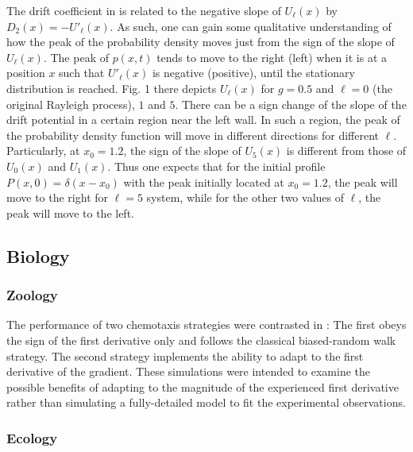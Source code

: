 \documentclass[11pt]{book}
\begin{document}
The drift coefficient in \cite{ho2020fractional} is related to the
negative slope of $U_{\ell}\left(x\right)$ by $D_{2}\left(x\right)=-U'_{\ell}\left(x\right)$.
As such, one can gain some qualitative understanding of how the peak of
the probability density moves just from the sign of the slope of $U_{\ell}\left(x\right)$.
The peak of $p\left(x,t\right)$ tends to move to the right (left)
when it is at a position $x$ such that $U'_{\ell}\left(x\right)$
is negative (positive), until the stationary distribution is reached.
Fig. 1 there depicts $U_{\ell}\left(x\right)$ for $g=0.5$ and $\ell=0$
(the original Rayleigh process), $1$ and $5$. There can be a sign
change of the slope of the drift potential in a certain region near
the left wall. In such a region, the peak of the probability density
function will move in different directions for different $\ell$.
Particularly, at $x_{0}=1.2$, the sign of the slope of $U_{5}\left(x\right)$
is different from those of $U_{0}\left(x\right)$ and $U_{1}\left(x\right)$.
Thus one expects that for the initial profile $P\left(x,0\right)=\delta\left(x-x_{0}\right)$
with the peak initially located at $x_{0}=1.2$, the peak will move
to the right for $\ell=5$ system, while for the other two values
of $\ell$, the peak will move to the left.


\subsection{Biology}


\subsubsection{Zoology}

The performance of two chemotaxis strategies were contrasted in \cite{itskovits2018concerted}:
The first obeys the sign of the first derivative only and follows
the classical biased-random walk strategy. The second strategy implements
the ability to adapt to the first derivative of the gradient. These
simulations were intended to examine the possible benefits of adapting
to the magnitude of the experienced first derivative rather than simulating
a fully-detailed model to fit the experimental observations.


\subsubsection{Ecology}
\end{document}
